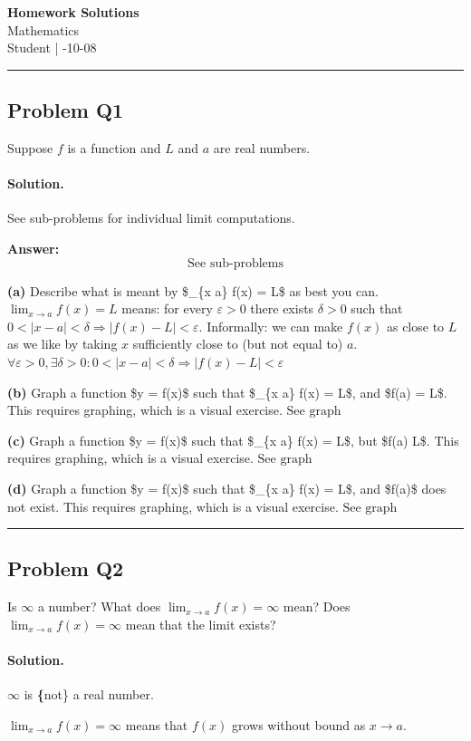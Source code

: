 \documentclass[12pt, a4paper]{article}
\newcommand{\problem}[1]{\subsection*{Problem #1}}
\newcommand{\solution}{\paragraph{Solution.}}
\begin{document}
\begin{center}
    {\LARGE\bfseries Homework Solutions} \\[0.5em]
    {\large Mathematics} \\[0.3em]
    Student \quad | -10-08
\end{center}

\hrule
\vspace{1em}
\problem{Q1}

Suppose $f$ is a function and $L$ and $a$ are real numbers.

\solution

See sub-problems for individual limit computations.

\textbf{Answer:}
\[\text{See sub-problems}\]

\textbf{(a)}
Describe what is meant by \$\lim\_\{x \to a\} f(x) = L\$ as best you can.
$\lim_{x \to a} f(x) = L$ means: for every $\varepsilon > 0$ there exists $\delta > 0$ such that
$0 < |x - a| < \delta \Rightarrow |f(x) - L| < \varepsilon$.
Informally: we can make $f(x)$ as close to $L$ as we like by taking $x$ sufficiently close to (but not equal to) $a$.
$\boxed{\forall \varepsilon > 0, \exists \delta > 0: 0 < |x-a| < \delta \Rightarrow |f(x)-L| < \varepsilon}$

\textbf{(b)}
Graph a function \$y = f(x)\$ such that \$\lim\_\{x \to a\} f(x) = L\$, and \$f(a) = L\$.
This requires graphing, which is a visual exercise.
$\boxed{\text{See graph}}$

\textbf{(c)}
Graph a function \$y = f(x)\$ such that \$\lim\_\{x \to a\} f(x) = L\$, but \$f(a) \neq L\$.
This requires graphing, which is a visual exercise.
$\boxed{\text{See graph}}$

\textbf{(d)}
Graph a function \$y = f(x)\$ such that \$\lim\_\{x \to a\} f(x) = L\$, and \$f(a)\$ does not exist.
This requires graphing, which is a visual exercise.
$\boxed{\text{See graph}}$

\vspace{1em}
\hrule
\vspace{1em}

\problem{Q2}

Is $\infty$ a number? What does $\lim_{x \to a} f(x) = \infty$ mean? Does $\lim_{x \to a} f(x) = \infty$ mean that the limit exists?

\solution

$\infty$ is \textbf\{not\} a real number.

$\lim_{x \to a} f(x) = \infty$ means that $f(x)$ grows without bound as $x \to a$.
\end{document}

